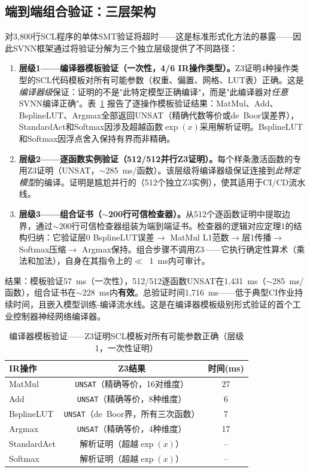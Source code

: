 \documentclass[journal,onecolumn]{IEEEtran}
\theoremstyle{definition}
\theoremstyle{plain}
\theoremstyle{remark}
\begin{document}
\subsection{端到端组合验证：三层架构}
\label{sec:compositional}

对3,800行SCL程序的单体SMT验证将超时——这是标准形式化方法的暴露——因此SVNN框架通过将验证分解为三个独立层级提供了不同路径：

\begin{enumerate}
    \item \textbf{层级1——编译器模板验证（一次性，4/6 IR操作类型）。}Z3证明4种操作类型的SCL代码模板对所有可能参数（权重、偏置、网格、LUT表）正确。这是\textit{编译器级}保证：证明的不是"此特定模型正确编译"，而是"此编译器对\textit{任意}SVNN编译正确"。表~\ref{tab:template_verify} 报告了逐操作模板验证结果：MatMul、Add、BsplineLUT、Argmax全部返回UNSAT（精确代数等价或de~Boor误差界），StandardAct和Softmax因涉及超越函数$\exp(x)$采用解析证明。BsplineLUT和Softmax因浮点舍入保持有界而非精确。

    \item \textbf{层级2——逐函数实例验证（512/512并行Z3证明）。}每个样条激活函数的专用Z3证明（UNSAT，$\sim$285~ms/函数）。该层级将编译器级保证连接到\textit{此特定模型}的编译。证明是尴尬并行的（512个独立Z3实例），使其适用于CI/CD流水线。

    \item \textbf{层级3——组合证书（$\sim$200行可信检查器）。}从512个逐函数证明中提取边界，通过$\sim$200行可信检查器组装为端到端证书。检查器的逻辑对应定理1的结构归纳：它验证层0 BsplineLUT误差$\rightarrow$ MatMul L1范数$\rightarrow$层1传播$\rightarrow$ Softmax压缩$\rightarrow$ Argmax保持。组合步骤不调用Z3——它执行确定性算术（乘法和加法），自身在其指令上的$\ll$~1~ms内可审计。
\end{enumerate}

结果：模板验证57~ms（一次性），512/512逐函数UNSAT在1,431~ms（$\sim$285~ms/函数），组合证书在$\sim$228~ms内\textbf{有效}。总验证时间1,716~ms——低于典型CI作业持续时间，且嵌入模型训练-编译流水线。这是在编译器模板级别形式验证的首个工业控制器神经网络编译器。

\begin{table}[!t]
\centering
\caption{编译器模板验证——Z3证明SCL模板对所有可能参数正确（层级1，一次性证明）}
\label{tab:template_verify}
\small
\begin{tabular}{@{}lcc@{}}
\toprule
\textbf{IR操作} & \textbf{Z3结果} & \textbf{时间(ms)} \\
\midrule
  MatMul      & \texttt{UNSAT}（精确等价，16对维度）     & 27 \\
  Add         & \texttt{UNSAT}（精确等价，8种维度）      &  6 \\
  BsplineLUT  & \texttt{UNSAT}（de~Boor界，所有三次函数） &  7 \\
  Argmax      & \texttt{UNSAT}（精确等价，4种维度）       & 17 \\
  StandardAct & 解析证明（超越$\exp(x)$）                  & -- \\
  Softmax     & 解析证明（超越$\exp(x)$）                  & -- \\
\bottomrule
\end{tabular}
\end{table}
\end{document}
